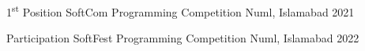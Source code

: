 



\begin{cvhonors}

  \cvhonor
    {1\textsuperscript{st} Position} %
    {SoftCom Programming Competition} %
    {Numl, Islamabad} %
    {2021} %

  \cvhonor
    {Participation} %
    {SoftFest Programming Competition} %
    {Numl, Islamabad} %
    {2022} %

\end{cvhonors}